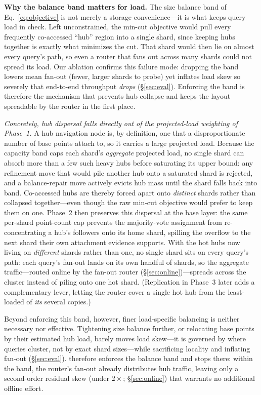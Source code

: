 \noindent\textbf{Why the balance band matters for load.} The size balance band of Eq.~\eqref{eq:objective} is not merely a storage convenience---it is what keeps query load in check. Left unconstrained, the min-cut objective would pull every frequently co-accessed ``hub'' region into a single shard, since keeping hubs together is exactly what minimizes the cut. That shard would then lie on almost every query's path, so even a router that fans out across many shards could not spread its load. Our ablation confirms this failure mode: dropping the band lowers mean fan-out (fewer, larger shards to probe) yet inflates load skew so severely that end-to-end throughput \emph{drops} (\S\ref{sec:eval}). Enforcing the band is therefore the mechanism that prevents hub collapse and keeps the layout spreadable by the router in the first place.

\emph{Concretely, hub dispersal falls directly out of the projected-load weighting of Phase~1.} A hub navigation node is, by definition, one that a disproportionate number of base points attach to, so it carries a large projected load. Because the capacity band caps each shard's \emph{aggregate} projected load, no single shard can absorb more than a few such heavy hubs before saturating its upper bound: any refinement move that would pile another hub onto a saturated shard is rejected, and a balance-repair move actively evicts hub mass until the shard falls back into band. Co-accessed hubs are thereby forced apart onto \emph{distinct} shards rather than collapsed together---even though the raw min-cut objective would prefer to keep them on one. Phase~2 then preserves this dispersal at the base layer: the same per-shard point-count cap prevents the majority-vote assignment from re-concentrating a hub's followers onto its home shard, spilling the overflow to the next shard their own attachment evidence supports. With the hot hubs now living on \emph{different} shards rather than one, no single shard sits on every query's path: each query's fan-out lands on its own handful of shards, so the aggregate traffic---routed online by the fan-out router (\S\ref{sec:online})---spreads across the cluster instead of piling onto one hot shard. (Replication in Phase~3 later adds a complementary lever, letting the router cover a single hot hub from the least-loaded of \emph{its} several copies.)

Beyond enforcing this band, however, finer load-specific balancing is neither necessary nor effective. Tightening size balance further, or relocating base points by their estimated hub load, barely moves load skew---it is governed by where queries cluster, not by exact shard sizes---while sacrificing locality and inflating fan-out (\S\ref{sec:eval}). \sysname therefore enforces the balance band and stops there: within the band, the router's fan-out already distributes hub traffic, leaving only a second-order residual skew (under $2\times$; \S\ref{sec:online}) that warrants no additional offline effort.

